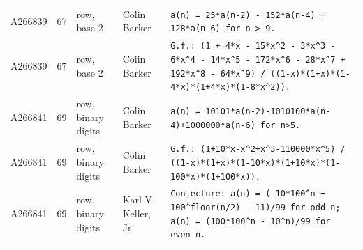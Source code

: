 \documentclass[11pt]{article}
\theoremstyle{definition}
\theoremstyle{remark}
\begin{document}
{\begin{longtable}{p{1.3cm}p{0.7cm}p{2.4cm}p{2.3cm}p{7.3cm}}
A266839 & 67 & row, base 2 & Colin Barker & \texttt{a(n)\allowbreak{} \allowbreak{}=\allowbreak{} \allowbreak{}25*\allowbreak{}a(n-\allowbreak{}2)\allowbreak{} \allowbreak{}-\allowbreak{} \allowbreak{}152*\allowbreak{}a(n-\allowbreak{}4)\allowbreak{} \allowbreak{}+\allowbreak{} \allowbreak{}128*\allowbreak{}a(n-\allowbreak{}6)\allowbreak{} \allowbreak{}for \allowbreak{}n \allowbreak{}> \allowbreak{}9.} \\
A266839 & 67 & row, base 2 & Colin Barker & \texttt{G.f.: \allowbreak{}(1 \allowbreak{}+\allowbreak{} \allowbreak{}4*\allowbreak{}x \allowbreak{}-\allowbreak{} \allowbreak{}15*\allowbreak{}x\^{}2 \allowbreak{}-\allowbreak{} \allowbreak{}3*\allowbreak{}x\^{}3 \allowbreak{}-\allowbreak{} \allowbreak{}6*\allowbreak{}x\^{}4 \allowbreak{}-\allowbreak{} \allowbreak{}14*\allowbreak{}x\^{}5 \allowbreak{}-\allowbreak{} \allowbreak{}172*\allowbreak{}x\^{}6 \allowbreak{}-\allowbreak{} \allowbreak{}28*\allowbreak{}x\^{}7 \allowbreak{}+\allowbreak{} \allowbreak{}192*\allowbreak{}x\^{}8 \allowbreak{}-\allowbreak{} \allowbreak{}64*\allowbreak{}x\^{}9)\allowbreak{} \allowbreak{}/\allowbreak{} \allowbreak{}((1-\allowbreak{}x)\allowbreak{}*\allowbreak{}(1+\allowbreak{}x)\allowbreak{}*\allowbreak{}(1-\allowbreak{}4*\allowbreak{}x)\allowbreak{}*\allowbreak{}(1+\allowbreak{}4*\allowbreak{}x)\allowbreak{}*\allowbreak{}(1-\allowbreak{}8*\allowbreak{}x\^{}2)\allowbreak{})\allowbreak{}.} \\
A266841 & 69 & row, binary digits & Colin Barker & \texttt{a(n)\allowbreak{} \allowbreak{}=\allowbreak{} \allowbreak{}10101*\allowbreak{}a(n-\allowbreak{}2)\allowbreak{}-\allowbreak{}1010100*\allowbreak{}a(n-\allowbreak{}4)\allowbreak{}+\allowbreak{}1000000*\allowbreak{}a(n-\allowbreak{}6)\allowbreak{} \allowbreak{}for \allowbreak{}n>5.} \\
A266841 & 69 & row, binary digits & Colin Barker & \texttt{G.f.: \allowbreak{}(1+\allowbreak{}10*\allowbreak{}x-\allowbreak{}x\^{}2+\allowbreak{}x\^{}3-\allowbreak{}110000*\allowbreak{}x\^{}5)\allowbreak{} \allowbreak{}/\allowbreak{} \allowbreak{}((1-\allowbreak{}x)\allowbreak{}*\allowbreak{}(1+\allowbreak{}x)\allowbreak{}*\allowbreak{}(1-\allowbreak{}10*\allowbreak{}x)\allowbreak{}*\allowbreak{}(1+\allowbreak{}10*\allowbreak{}x)\allowbreak{}*\allowbreak{}(1-\allowbreak{}100*\allowbreak{}x)\allowbreak{}*\allowbreak{}(1+\allowbreak{}100*\allowbreak{}x)\allowbreak{})\allowbreak{}.} \\
A266841 & 69 & row, binary digits & Karl V. Keller, Jr. & \texttt{Conjecture: \allowbreak{}a(n)\allowbreak{} \allowbreak{}=\allowbreak{} \allowbreak{}( \allowbreak{}10*\allowbreak{}100\^{}n \allowbreak{}+\allowbreak{} \allowbreak{}100\^{}floor(n/\allowbreak{}2)\allowbreak{} \allowbreak{}-\allowbreak{} \allowbreak{}11)\allowbreak{}/\allowbreak{}99 \allowbreak{}for \allowbreak{}odd \allowbreak{}n; \allowbreak{}a(n)\allowbreak{} \allowbreak{}=\allowbreak{} \allowbreak{}(100*\allowbreak{}100\^{}n \allowbreak{}-\allowbreak{} \allowbreak{}10\^{}n)\allowbreak{}/\allowbreak{}99 \allowbreak{}for \allowbreak{}even \allowbreak{}n.} \\

\end{longtable}}
\end{document}
